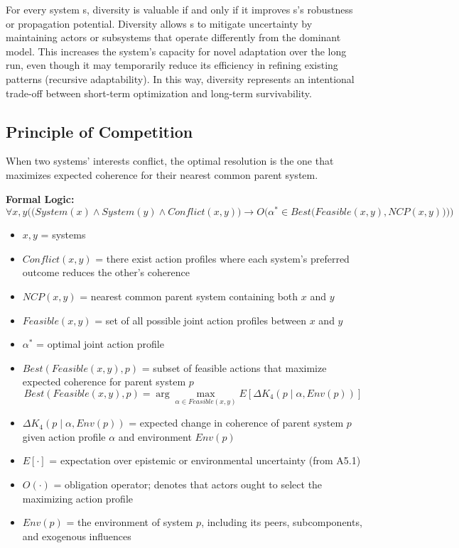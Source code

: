 \documentclass[11pt]{article}
\begin{document}
For every system s, diversity is valuable if and only if it improves s’s robustness or propagation potential. Diversity allows s to mitigate uncertainty by maintaining actors or subsystems that operate differently from the dominant model. This increases the system’s capacity for novel adaptation over the long run, even though it may temporarily reduce its efficiency in refining existing patterns (recursive adaptability). In this way, diversity represents an intentional trade-off between short-term optimization and long-term survivability.

\subsection*{Principle of Competition}
When two systems’ interests conflict, the optimal resolution is the one that maximizes expected coherence for their nearest common parent system.

\textbf{Formal Logic:}
\[
\forall x, y \Bigg( 
  \Big( System(x) \land System(y) \land Conflict(x, y) \Big) 
  \rightarrow 
  O\Big( \alpha^* \in Best\big( Feasible(x, y), NCP(x, y) \big) \Big) 
\Bigg)
\]

\begin{itemize}
\item $x, y$ = systems
\item $Conflict(x, y)$ = there exist action profiles where each system’s preferred outcome reduces the other’s coherence
\item $NCP(x, y)$ = nearest common parent system containing both $x$ and $y$
\item $Feasible(x, y)$ = set of all possible joint action profiles between $x$ and $y$
\item $\alpha^*$ = optimal joint action profile
\item $Best(Feasible(x, y), p)$ = subset of feasible actions that maximize expected coherence for parent system $p$
\[
Best(Feasible(x, y), p) = \arg\max_{\alpha \in Feasible(x, y)} E[\Delta K_4(p \mid \alpha, Env(p))]
\]
\item $\Delta K_4(p \mid \alpha, Env(p))$ = expected change in coherence of parent system $p$ given action profile $\alpha$ and environment $Env(p)$
\item $E[\cdot]$ = expectation over epistemic or environmental uncertainty (from A5.1)
\item $O(\cdot)$ = obligation operator; denotes that actors ought to select the maximizing action profile
\item $Env(p)$ = the environment of system $p$, including its peers, subcomponents, and exogenous influences
\end{itemize}
\end{document}
